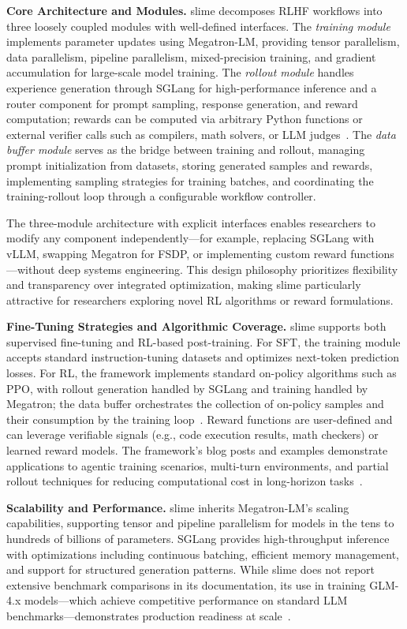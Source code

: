 \documentclass[conference]{IEEEtran}
\begin{document}
\textbf{Core Architecture and Modules.} slime decomposes RLHF workflows into three loosely coupled modules with well-defined interfaces. The \textit{training module} implements parameter updates using Megatron-LM, providing tensor parallelism, data parallelism, pipeline parallelism, mixed-precision training, and gradient accumulation for large-scale model training. The \textit{rollout module} handles experience generation through SGLang for high-performance inference and a router component for prompt sampling, response generation, and reward computation; rewards can be computed via arbitrary Python functions or external verifier calls such as compilers, math solvers, or LLM judges~\cite{slime-github}. The \textit{data buffer module} serves as the bridge between training and rollout, managing prompt initialization from datasets, storing generated samples and rewards, implementing sampling strategies for training batches, and coordinating the training-rollout loop through a configurable workflow controller.

The three-module architecture with explicit interfaces enables researchers to modify any component independently—for example, replacing SGLang with vLLM, swapping Megatron for FSDP, or implementing custom reward functions—without deep systems engineering. This design philosophy prioritizes flexibility and transparency over integrated optimization, making slime particularly attractive for researchers exploring novel RL algorithms or reward formulations.

\textbf{Fine-Tuning Strategies and Algorithmic Coverage.} slime supports both supervised fine-tuning and RL-based post-training. For SFT, the training module accepts standard instruction-tuning datasets and optimizes next-token prediction losses. For RL, the framework implements standard on-policy algorithms such as PPO, with rollout generation handled by SGLang and training handled by Megatron; the data buffer orchestrates the collection of on-policy samples and their consumption by the training loop~\cite{slime-github}. Reward functions are user-defined and can leverage verifiable signals (e.g., code execution results, math checkers) or learned reward models. The framework's blog posts and examples demonstrate applications to agentic training scenarios, multi-turn environments, and partial rollout techniques for reducing computational cost in long-horizon tasks~\cite{slime-blog}.

\textbf{Scalability and Performance.} slime inherits Megatron-LM's scaling capabilities, supporting tensor and pipeline parallelism for models in the tens to hundreds of billions of parameters. SGLang provides high-throughput inference with optimizations including continuous batching, efficient memory management, and support for structured generation patterns. While slime does not report extensive benchmark comparisons in its documentation, its use in training GLM-4.x models—which achieve competitive performance on standard LLM benchmarks—demonstrates production readiness at scale~\cite{slime-github}.
\end{document}
